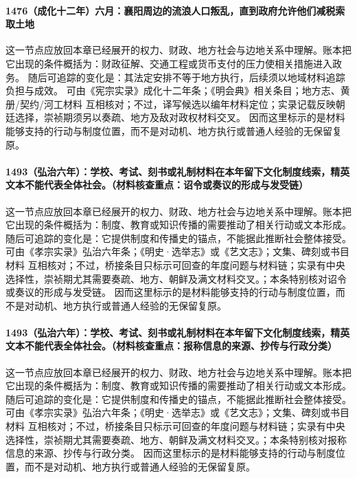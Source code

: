 \paragraph{1476（成化十二年）六月：襄阳周边的流浪人口叛乱，直到政府允许他们减税索取土地} 这一节点应放回本章已经展开的权力、财政、地方社会与边地关系中理解。账本把它出现的条件概括为：财政征解、交通工程或货币支付的压力使相关措施进入政务。 随后可追踪的变化是：其法定安排不等于地方执行，后续须以地域材料追踪负担与成效。 可由《宪宗实录》成化十二年条；《明会典》相关条目；地方志、黄册/契约/河工材料 互相核对；不过，译写候选以编年材料定位；实录记载反映朝廷选择，崇祯期须另以奏疏、地方及敌对政权材料交叉。 因而这里标示的是材料能够支持的行动与制度位置，而不是对动机、地方执行或普通人经验的无保留复原。

\paragraph{1493（弘治六年）：学校、考试、刻书或礼制材料在本年留下文化制度线索，精英文本不能代表全体社会。（材料核查重点：诏令或奏议的形成与发受链）} 这一节点应放回本章已经展开的权力、财政、地方社会与边地关系中理解。账本把它出现的条件概括为：制度、教育或知识传播的需要推动了相关行动或文本形成。 随后可追踪的变化是：它提供制度和传播史的锚点，不能据此推断社会整体接受。 可由《孝宗实录》弘治六年条；《明史·选举志》或《艺文志》；文集、碑刻或书目材料 互相核对；不过，桥接条目只标示可回查的年度问题与材料链；实录有中央选择性，崇祯期尤其需要奏疏、地方、朝鲜及满文材料交叉。；本条特别核对诏令或奏议的形成与发受链。 因而这里标示的是材料能够支持的行动与制度位置，而不是对动机、地方执行或普通人经验的无保留复原。

\paragraph{1493（弘治六年）：学校、考试、刻书或礼制材料在本年留下文化制度线索，精英文本不能代表全体社会。（材料核查重点：报称信息的来源、抄传与行政分类）} 这一节点应放回本章已经展开的权力、财政、地方社会与边地关系中理解。账本把它出现的条件概括为：制度、教育或知识传播的需要推动了相关行动或文本形成。 随后可追踪的变化是：它提供制度和传播史的锚点，不能据此推断社会整体接受。 可由《孝宗实录》弘治六年条；《明史·选举志》或《艺文志》；文集、碑刻或书目材料 互相核对；不过，桥接条目只标示可回查的年度问题与材料链；实录有中央选择性，崇祯期尤其需要奏疏、地方、朝鲜及满文材料交叉。；本条特别核对报称信息的来源、抄传与行政分类。 因而这里标示的是材料能够支持的行动与制度位置，而不是对动机、地方执行或普通人经验的无保留复原。


